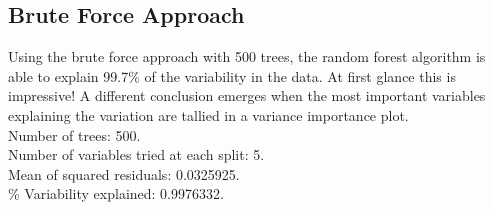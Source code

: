 \documentclass{article}\usepackage[]{graphicx}\usepackage[]{color}
\begin{document}
\subsection*{Brute Force Approach}

Using the brute force approach with 500 trees, the random forest algorithm is able to explain 99.7\% of the variability in the data. At first glance this is impressive! A different conclusion emerges when the most important variables explaining the variation are tallied in a variance importance plot.\\


Number of trees: 500.\\

Number of variables tried at each split: 5.\\

Mean of squared residuals: 0.0325925. \\

\% Variability explained:  0.9976332.\\
\end{document}
